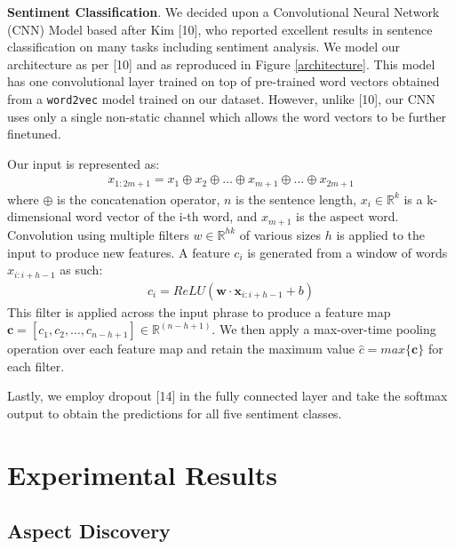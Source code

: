 \documentclass{article} %
\begin{document}
\textbf{Sentiment Classification}. We decided upon a Convolutional Neural Network (CNN) Model based after Kim [10], who reported excellent results in sentence classification on many tasks including sentiment analysis. We model our architecture as per [10] and as reproduced in Figure \ref{architecture}. This model has one convolutional layer trained on top of pre-trained word vectors obtained from a \texttt{word2vec} model trained on our dataset. However, unlike [10], our CNN uses only a single non-static channel which allows the word vectors to be further finetuned.

Our input is represented as:
\begin{align}
	x_{1:2m+1} = x_1 \oplus x_2 \oplus \ldots \oplus x_{m+1} \oplus \ldots \oplus x_{2m+1}
\end{align}
where $\oplus$ is the concatenation operator, $n$ is the sentence length, $x_i \in \mathbb{R}^k$ is a k-dimensional word vector of the i-th word, and $x_{m+1}$ is the aspect word. Convolution using multiple filters $w \in \mathbb{R}^{hk}$ of various sizes $h$ is applied to the input to produce new features. A feature $c_i$ is generated from a window of words $x_{i:i+h-1}$ as such:
\begin{align}
c_i = ReLU(\textbf{w} \cdot \textbf{x}_{i:i+h-1} + b)
\end{align}
This filter is applied across the input phrase to produce a feature map $\textbf{c} = [c_1, c_2, \ldots, c_{n-h+1}] \in \mathbb{R}^(n-h+1)$. We then apply a max-over-time pooling operation over each feature map and retain the maximum value $\hat{c} = max \{\textbf{c}\}$ for each filter.

Lastly, we employ dropout [14] in the fully connected layer and take the softmax output to obtain the predictions for all five sentiment classes.


\section{Experimental Results} 

\subsection{Aspect Discovery} 
\end{document}
